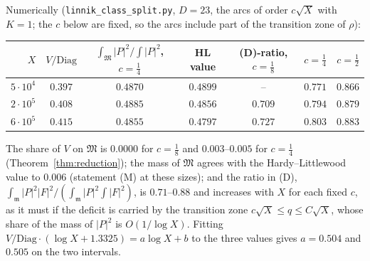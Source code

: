 \documentclass[11pt]{amsart}
\theoremstyle{remark}
\begin{document}
Numerically (\texttt{linnik\_class\_split.py}, $D=23$, the arcs of order $c\sqrt X$ with $K=1$; the $c$ below are fixed, so the arcs include part of the transition zone of $\rho$):
\begin{center}\footnotesize
\begin{tabular}{r|c|cc|ccc}
\toprule
$X$ & $V/\mathrm{Diag}$ & $\int_{\mathfrak M}|P|^2/\int|P|^2$, $c=\frac14$ & HL value & (D)-ratio, $c=\frac18$ & $c=\frac14$ & $c=\frac12$\\
\midrule
$5\cdot10^4$ & $0.397$ & $0.4870$ & $0.4899$ & -- & $0.771$ & $0.866$\\
$2\cdot10^5$ & $0.408$ & $0.4885$ & $0.4856$ & $0.709$ & $0.794$ & $0.879$\\
$6\cdot10^5$ & $0.415$ & $0.4855$ & $0.4797$ & $0.727$ & $0.803$ & $0.883$\\
\bottomrule
\end{tabular}
\end{center}
The share of $V$ on $\mathfrak M$ is $0.0000$ for $c=\frac18$ and $0.003$--$0.005$ for $c=\frac14$ (Theorem~\ref{thm:reduction}); the mass of $\mathfrak M$ agrees with the Hardy--Littlewood value to $0.006$ (statement (M) at these sizes); and the ratio in (D), $\int_{\mathfrak m}|P|^2|F|^2/(\int_{\mathfrak m}|P|^2\int|F|^2)$, is $0.71$--$0.88$ and increases with $X$ for each fixed $c$, as it must if the deficit is carried by the transition zone $c\sqrt X\le q\le C\sqrt X$, whose share of the mass of $|P|^2$ is $O(1/\log X)$. Fitting $V/\mathrm{Diag}\cdot(\log X+1.3325)=a\log X+b$ to the three values gives $a=0.504$ and $0.505$ on the two intervals.
\end{document}
